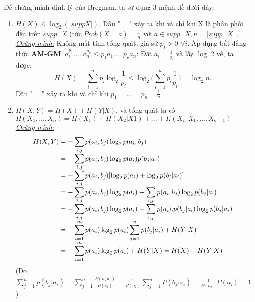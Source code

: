 \documentclass[a4paper]{report}
\begin{document}
Để chứng minh định lý của Bregman, ta sử dụng 3 mệnh đề dưới đây:
\begin{enumerate}[label=\textbf{(\Alph*)}]
\item 
	$H(X) \leq \log_{2}(|supp X|)$. Dấu "$=$" xảy ra khi và chỉ khi X là phân phối đều trên $supp \text{ }X$ (tức $Prob(X=a) = \frac{1}{n}$ với $a \in supp \text{ }X,n=|supp \text{ }X|$ .
\\

\textit{\underline{Chứng minh:}} Không mất tính tổng quát, giả sử $p_{i} > 0$  $\forall i$. Áp dụng bất đẳng thức \textbf{AM-GM}: $a_{1}^{p_{1}}. ... .a_{n}^{p_{n}} \leq p_{1}a_{1}. ... .p_{n}a_{n}$: Đặt $a_{i} = \frac{1}{p_{i}}$ và lấy $\log$ 2 vế, ta được:
\begin{equation*}
H(X) = \displaystyle \sum_{i=1}^{n}p_{i}\log_{2}\frac{1}{p_{i}} \leq \log_{2}\Big(\displaystyle \sum_{i=1}^{n}p_{i}\frac{1}{p_{i}}\Big) = \log_{2}n.
\end{equation*}
Dấu "$=$" xảy ra khi và chỉ khi $p_{1} = ... = p_{n} = \frac{1}{n}$

\item 
	\(H(X,Y) = H(X) + H(Y|X)\), và tổng quát ta có \(H(X_{1},...,X_{n}) = H(X_{1}) + H(X_{2}|X{1}) + ... + H(X_{n}|X_{1},...,X_{n-1})\)
\\

\textit{\underline{Chứng minh:}}
\begin{equation*}
\begin{array}{l@{}l}
H(X,Y)
	&{}= \displaystyle -\sum_{i,j}p(a_{i},b_{j})\log_{2} p(a_{i},b_{j}) \\
	&{}= \displaystyle -\sum_{i,j}p(a_{i},b_{j})\log_{2} p(a_{i})p(b_{j}|a_{i}) \\ 
	&{}= \displaystyle -\sum_{i,j}p(a_{i},b_{j})[\log_{2}p(a_{i}) + \log_{2}p(b_{j}|a_{i}) ] \\
	&{}= \displaystyle -\sum_{i,j}p(a_{i},b_{j})\log_{2}p(a_{i})  \displaystyle -\sum_{i,j}p(a_{i},b_{j})\log_{2}p(b_{j}|a_{i}) \\
	&{}= \displaystyle -\sum_{i,j}p(a_{i},b_{j})\log_{2}p(a_{i}) \displaystyle -\sum_{i,j}p(a_{i}).p(b_{j}|a_{i})\log_{2}p(b_{j}|a_{i}) \\
	&{}= \displaystyle -\sum_{i=1}^{m}p(a_{i}) \log_{2}p(a_{i}) \displaystyle \sum_{j=1}^{n}p(b_{j}|a_{i}) + H(Y|X) \\
	&{}= \displaystyle -\sum_{i=1}^{m}p(a_{i}) \log_{2}p(a_{i}) + H(Y|X) = H(X) + H(Y|X) 
\end{array}
\end{equation*}
(Do $\displaystyle \sum_{j=1}^{n}p(b_{j}|a_{i}) = \displaystyle \sum_{j=1}^{n}\frac{P(b_{j}.a_{i})}{P(a_{i})} = \frac{1}{P(a_{i})}\displaystyle \sum_{j=1}^{n}P(b_{j}.a_{i})=\frac{1}{P(a_{i})}P(a_{i}) =1  $)


\end{enumerate}
\end{document}
